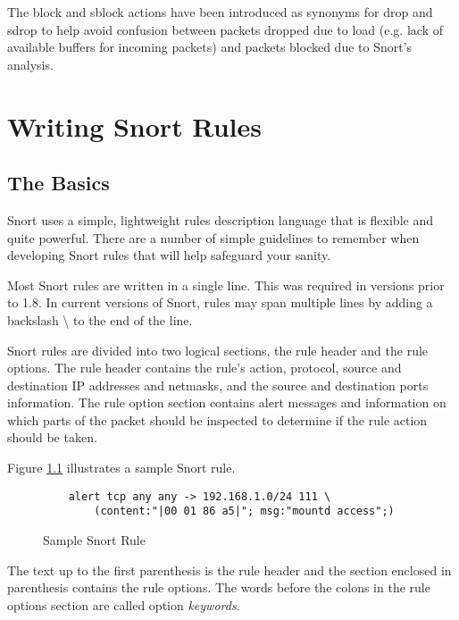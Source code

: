 \documentclass[english]{report}
\begin{document}
The block and sblock actions have been introduced as synonyms for drop and
sdrop to help avoid confusion between packets dropped due to load (e.g. lack of
available buffers for incoming packets) and packets blocked due to Snort's
analysis.


\chapter{Writing Snort Rules}
\label{Writing Snort Rules}

\section{The Basics}

Snort uses a simple, lightweight rules description language that is flexible
and quite powerful. There are a number of simple guidelines to remember when
developing Snort rules that will help safeguard your sanity.

Most Snort rules are written in a single line. This was required in versions
prior to 1.8. In current versions of Snort, rules may span multiple lines by
adding a backslash \textbackslash{} to the end of the line. 

Snort rules are divided into two logical sections, the rule header and the rule
options. The rule header contains the rule's action, protocol, source and
destination IP addresses and netmasks, and the source and destination ports
information. The rule option section contains alert messages and information on
which parts of the packet should be inspected to determine if the rule action
should be taken.

Figure \ref{Sample Snort Rule} illustrates a sample Snort rule.

\begin{center}
\begin{figure}
\begin{verbatim}
    alert tcp any any -> 192.168.1.0/24 111 \
        (content:"|00 01 86 a5|"; msg:"mountd access";)
\end{verbatim}

\caption{Sample Snort Rule}
\label{Sample Snort Rule}
\end{figure}
\end{center}

The text up to the first parenthesis is the rule header and the section
enclosed in parenthesis contains the rule options. The words before the colons
in the rule options section are called option \emph{keywords}. 
\end{document}
